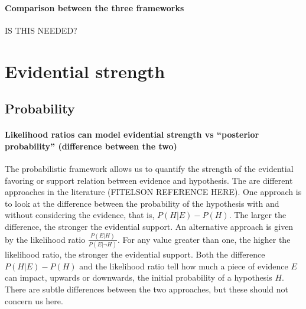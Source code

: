 \documentclass[10pt]{article}
\begin{document}
\paragraph{Comparison between the three frameworks} IS THIS NEEDED?




\section{Evidential strength}
\label{sec:str}

\subsection{Probability}


\paragraph{Likelihood ratios can model evidential strength vs ``posterior probability'' (difference between the two)}

The probabilistic framework allows us to quantify the strength of the evidential favoring or support relation between evidence and hypothesis. 
The are different approaches in the literature (FITELSON REFERENCE HERE). 
One approach is to look at the difference between the probability of the hypothesis with and without considering the evidence, that is, $P(H | E) - P(H)$.
The larger the difference, the stronger the evidential support. 
An alternative approach is given by the likelihood ratio $\frac{P(E|H)}{P(E| \neg H)}$. 
For any value greater than one,  the higher the likelihood ratio, 
the stronger the evidential support. %
%
%
Both the difference $P(H|E) - P(H)$ and the likelihood ratio tell 
how much a piece of evidence $E$ can impact, upwards or downwards, 
the initial probability of a hypothesis $H$. There are subtle differences between the two approaches, 
but these should not concern us here.
\end{document}
